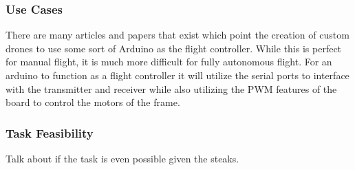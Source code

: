 \documentclass[conference,12pt, ]{IEEEtran}
\begin{document}
\subsubsection{Use Cases}
There are many articles and papers that exist which point the creation of custom drones to use some sort of Arduino as the flight controller. While this is perfect for manual flight, it is much more difficult for fully autonomous flight. For an arduino to function as a flight controller it will utilize the serial ports to interface with the transmitter and receiver while also utilizing the PWM features of the board to control the motors of the frame. 
\subsubsection{Task Feasibility}
Talk about if the task is even possible given the steaks.
\end{document}
